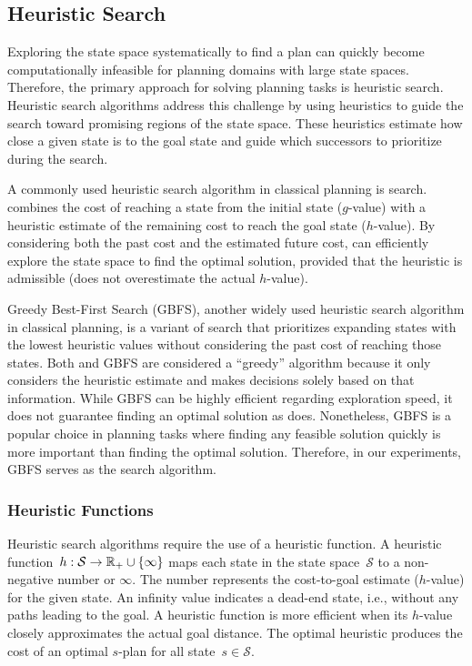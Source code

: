 \subsection{Heuristic Search}
\label{sec:background_heuristicsearch}

Exploring the state space systematically to find a plan can quickly become computationally infeasible for planning domains with large state spaces. Therefore, the primary approach for solving planning tasks is heuristic search. Heuristic search algorithms address this challenge by using heuristics to guide the search toward promising regions of the state space. These heuristics estimate how close a given state is to the goal state and guide which successors to prioritize during the search.

A commonly used heuristic search algorithm in classical planning is \astar search. \astar combines the cost of reaching a state from the initial state ($g$-value) with a heuristic estimate of the remaining cost to reach the goal state ($h$-value). By considering both the past cost and the estimated future cost, \astar can efficiently explore the state space to find the optimal solution, provided that the heuristic is admissible (does not overestimate the actual $h$-value).

Greedy Best-First Search (GBFS), another widely used heuristic search algorithm in classical planning, is a variant of \astar search that prioritizes expanding states with the lowest heuristic values without considering the past cost of reaching those states. Both \astar and GBFS are considered a ``greedy'' algorithm because it only considers the heuristic estimate and makes decisions solely based on that information. While GBFS can be highly efficient regarding exploration speed, it does not guarantee finding an optimal solution as \astar does. Nonetheless, GBFS is a popular choice in planning tasks where finding any feasible solution quickly is more important than finding the optimal solution. Therefore, in our experiments, GBFS serves as the search algorithm.

\subsubsection{Heuristic Functions}
\label{sec:background_heuristicfunctions}

Heuristic search algorithms require the use of a heuristic function. A heuristic function~$h:\mathcal{S}\rightarrow\mathbb{R}_{+}\cup\{\infty\}$ maps each state in the state space~$\mathcal{S}$ to a non-negative number or $\infty$. The number represents the cost-to-goal estimate ($h$-value) for the given state. An infinity value indicates a dead-end state, i.e., without any paths leading to the goal. A heuristic function is more efficient when its $h$-value closely approximates the actual goal distance. The optimal heuristic \hstar produces the cost of an optimal $s$-plan for all state~$s \in \mathcal{S}$.

